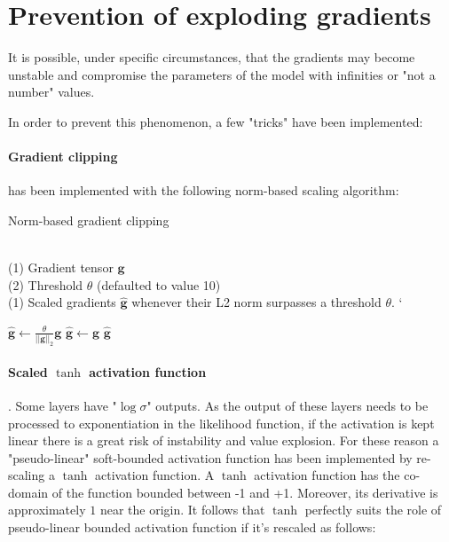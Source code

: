 \section{Prevention of exploding gradients}
It is possible, under specific circumstances, that the gradients may become unstable and
compromise the parameters of the model with infinities or "not a number" values.

In order to prevent this phenomenon, a few "tricks" have been implemented:

\paragraph{Gradient clipping}\cite{norm_clip} has been implemented with the
following norm-based scaling algorithm:

\begin{algorithm}
\caption{Norm-based gradient clipping}
\begin{algorithmic}[1]

\REQUIRE ~~\\
(1) Gradient tensor $\mathbf{g}$   \\
(2) Threshold $\theta$ (defaulted to value 10)
\ENSURE~~\\
(1) Scaled gradients $\hat{\mathbf{g}}$ whenever their L2 norm surpasses a threshold $\theta$.
`
\item[]
    \STATE $\hat{\mathbf{g}} \leftarrow \frac{\theta}{||\mathbf{g}||_2}\mathbf{g}$
\ELSE
    \STATE $\hat{\mathbf{g}} \leftarrow \mathbf{g}$
\ENDIF
\RETURN $\hat{\mathbf{g}}$
\end{algorithmic}
\end{algorithm}

\paragraph{Scaled $\tanh$ activation function}. Some layers have 
"$\log\sigma$" outputs. As the output of these layers needs to be processed to
exponentiation in the likelihood function, if the activation is kept linear
there is a great risk of instability and value explosion.
For these reason a "pseudo-linear" soft-bounded activation function has been implemented
by re-scaling a $\tanh$ activation function.
A $\tanh$ activation function has the co-domain of the function bounded between -1 and +1.
Moreover, its derivative is approximately $1$ near the origin. It follows that $\tanh$
perfectly suits the role of pseudo-linear bounded activation function if it's rescaled as
follows:

